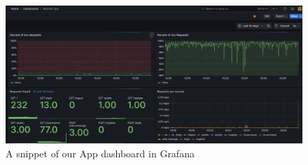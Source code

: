 \begin{figure}[h]
\centering
\includegraphics[width=\textwidth]{images/metrics.png}
\caption{A snippet of our App dashboard in Grafana}
\label{fig:monitoring}
\end{figure}